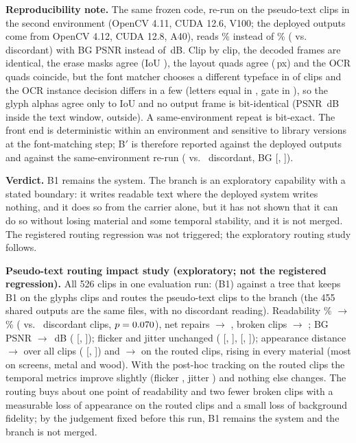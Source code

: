 \textbf{Reproducibility note.} The same frozen code, re-run on the pseudo-text clips in the second environment (OpenCV 4.11, CUDA 12.6, V100; the deployed outputs come from OpenCV 4.12, CUDA 12.8, A40), reads \lthreeBBrerunRead\% instead of \lthreeBBoneRead\% (\lthreeRerunWins{} vs.\ \lthreeRerunLosses{} discordant) with BG PSNR \lthreeBBrerunBG{} instead of \lthreeBBoneBG\,dB. Clip by clip, the decoded frames are identical, the erase masks agree (IoU \xenvMaskIoU), the layout quads agree (\xenvGeomPx\,px) and the OCR quads coincide, but the font matcher chooses a different typeface in \xenvFontDiff{} of \xenvN{} clips and the OCR instance decision differs in a few (letters equal in \xenvLettersSame, gate in \xenvGateSame), so the glyph alphas agree only to IoU \xenvAlphaIoU{} and no output frame is bit-identical (PSNR \xenvPsnrIn\,dB inside the text window, \xenvPsnrOut{} outside). A same-environment repeat is bit-exact. The front end is deterministic within an environment and sensitive to library versions at the font-matching step; B$'$ is therefore reported against the deployed outputs and against the same-environment re-run (\lthreeBrWins{} vs.\ \lthreeBrLosses{} discordant, BG \lthreeBrBGMean{} [\lthreeBrBGLo, \lthreeBrBGHi]).

\textbf{Verdict.} B1 remains the system. The branch is an exploratory capability with a stated boundary: it writes readable text where the deployed system writes nothing, and it does so from the carrier alone, but it has not shown that it can do so without losing material and some temporal stability, and it is not merged. The registered routing regression was not triggered; the exploratory routing study follows.

\textbf{Pseudo-text routing impact study (exploratory; not the registered regression).} All 526 clips in one evaluation run: \method (B1) against a tree that keeps B1 on the \lthreeGlyphs{} glyphs clips and routes the \lthreeLtwo{} pseudo-text clips to the branch (the 455 shared outputs are the same files, with no discordant reading). Readability \cexBoneRead\% $\to$ \cexCexRead\% (\cexWins{} vs.\ \cexLosses{} discordant clips, $p=0.070$), net repairs \cexBoneNet{} $\to$ \cexCexNet, broken clips \cexBoneBroken{} $\to$ \cexCexBroken; BG PSNR \cexBoneBG{} $\to$ \cexCexBG\,dB (\cexBGMean{} [\cexBGLo, \cexBGHi]); flicker and jitter unchanged (\cexFlickerMean{} [\cexFlickerLo, \cexFlickerHi], \cexJitterMean{} [\cexJitterLo, \cexJitterHi]); appearance distance \cexBoneMad{} $\to$ \cexCexMad{} over all clips (\cexMadMean{} [\cexMadLo, \cexMadHi]) and \cexBoneLtwoMad{} $\to$ \cexCexLtwoMad{} on the routed clips, rising in every material (most on screens, metal and wood). With the post-hoc tracking on the routed clips the temporal metrics improve slightly (flicker \cexCexAFlicker, jitter \cexCexAJitter) and nothing else changes. The routing buys about one point of readability and two fewer broken clips with a measurable loss of appearance on the routed clips and a small loss of background fidelity; by the judgement fixed before this run, B1 remains the system and the branch is not merged.


